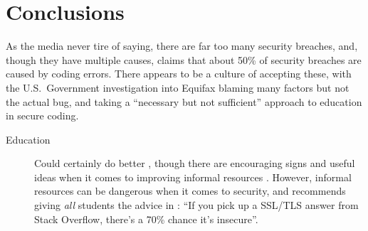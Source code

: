 \documentclass{eptcs}
\begin{document}
\section{Conclusions}
As the media never tire of saying, there are far too many security breaches, and, though they have multiple causes, \cite{McGraw2006} claims that about 50\% of security breaches are caused by coding errors. There appears to be a culture of accepting these, with the U.S.~Government investigation \cite{GAO2018a} into Equifax blaming many factors but not the actual bug, and \cite{PCI2018b}  taking a ``necessary but not sufficient'' approach to education in secure coding.
\begin{description}
\item[Education]Could certainly do better \cite{Cable2019a}, though there are encouraging signs \cite{Cricketal2019a} and useful ideas when it comes to improving informal resources  \cite{Fischeretal2019a}. However, informal resources can be dangerous when it comes to security, and \cite{Cricketal2019a} recommends giving \emph{all} students the advice in \cite{Chenetal2019a}: ``If you pick up a SSL/TLS answer from Stack Overflow, there's a 70\% chance it's insecure''.


\end{description}
\end{document}
